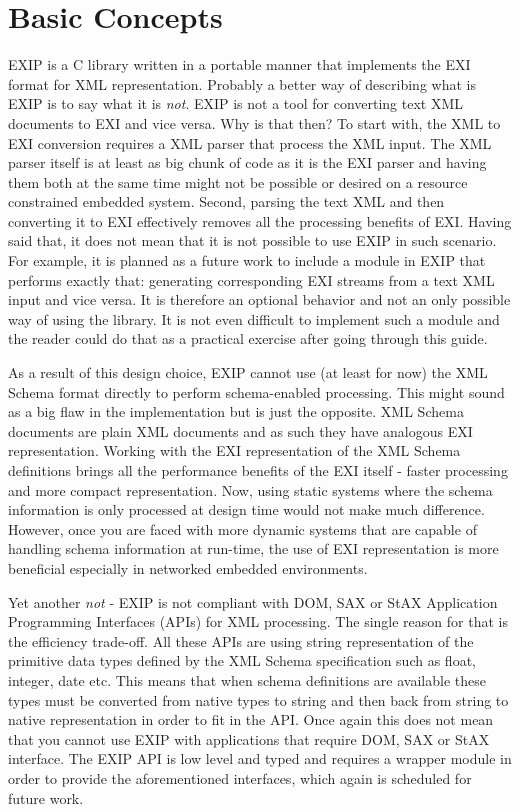 \section{Basic Concepts}
\label{sec:Basic-Concepts}

EXIP is a C library written in a portable manner that implements the EXI format for
XML representation. Probably a better way of describing what is EXIP is to say what it is \emph{not}.
EXIP is not a tool for converting text XML documents to EXI and vice versa. Why is that then?
To start with, the XML to EXI conversion requires a XML parser that process the XML input.
The XML parser itself is at least as big chunk of code as it is the EXI parser and having them
both at the same time might not be
possible or desired on a resource constrained embedded system. Second, parsing
the text XML and then converting it to EXI effectively removes all the processing benefits of EXI.
Having said that, it does not mean that it is not possible to use EXIP in such scenario. For example,
it is planned as a future work to include a module in EXIP that performs exactly that: generating
corresponding EXI streams from a text XML input and vice versa. It is therefore an optional
behavior and not an only possible way of using the library. It is not even difficult to implement
such a module and the reader could do that as a practical exercise after going through this guide.

As a result of this design choice, EXIP cannot use (at least for now) the XML Schema format directly
to perform schema-enabled processing. This might sound as a big flaw in the implementation but is
just the opposite. XML Schema documents are plain XML documents and as such they have analogous EXI
representation. Working with the EXI representation of the XML Schema definitions brings all the
performance benefits of the EXI itself - faster processing and more compact representation.
Now, using static systems where the schema information is only processed at design time would
not make much difference. However, once you are faced with more dynamic systems that are
capable of handling schema information at run-time, the use of EXI representation is more
beneficial especially in networked embedded environments.

Yet another \emph{not} - EXIP is not compliant with DOM, SAX or StAX Application Programming Interfaces (APIs)
for XML processing. The single reason for that is the efficiency trade-off. All these APIs are
using string representation of the primitive data types defined by the XML Schema specification
such as float, integer, date etc. This means that when schema definitions are available these
types must be converted from native types to string and then back from string to native representation
in order to fit in the API. Once again this does not mean that you cannot use EXIP with applications
that require DOM, SAX or StAX interface. The EXIP API is low level and typed and requires a
wrapper module in order to provide the aforementioned interfaces, which again is scheduled for future work.

